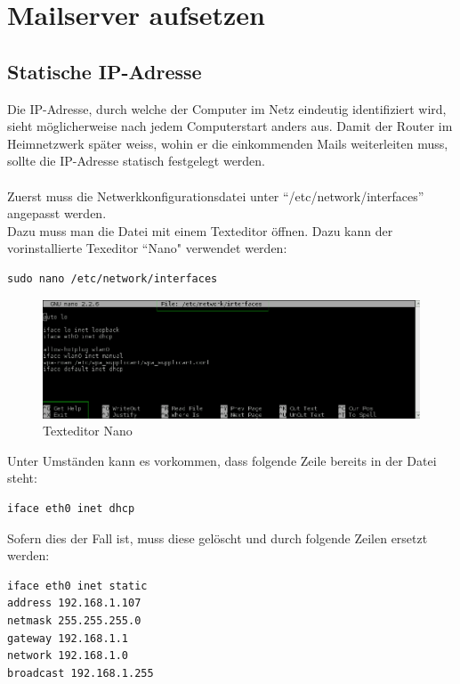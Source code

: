 \section{Mailserver aufsetzen}

\subsection{Statische IP-Adresse}
Die IP-Adresse, durch welche der Computer im Netz eindeutig identifiziert wird, sieht möglicherweise nach jedem Computerstart anders aus. Damit der Router im Heimnetzwerk später weiss, wohin er die einkommenden Mails weiterleiten muss, sollte die IP-Adresse statisch festgelegt werden.
\\
\\
Zuerst muss die Netwerkkonfigurationsdatei unter ``/etc/network/interfaces'' angepasst werden.
\\
Dazu muss man die Datei mit einem Texteditor öffnen. Dazu kann der vorinstallierte Texeditor ``Nano" verwendet werden:

\begin{lstlisting}
sudo nano /etc/network/interfaces
\end{lstlisting}

\begin{figure}[h]
\centering
\includegraphics[scale=0.6]{images/nano}
\caption{Texteditor Nano}
\end{figure}

Unter Umständen kann es vorkommen, dass folgende Zeile bereits in der Datei steht:

\begin{lstlisting}
iface eth0 inet dhcp
\end{lstlisting}

Sofern dies der Fall ist, muss diese gelöscht und durch folgende Zeilen ersetzt werden:

\begin{lstlisting}
iface eth0 inet static
address 192.168.1.107
netmask 255.255.255.0
gateway 192.168.1.1
network 192.168.1.0
broadcast 192.168.1.255
\end{lstlisting}

